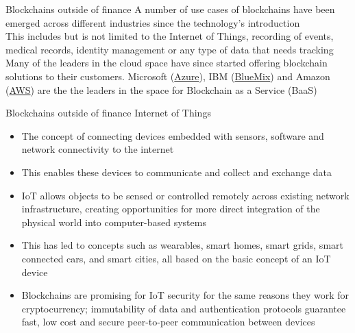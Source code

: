 \documentclass[10pt]{beamer}
\begin{document}
\begin{frame}{Blockchains outside of finance}
	A number of use cases of blockchains have been emerged across different industries since the technology's introduction \\ \vspace{3mm}
	This includes but is not limited to the Internet of Things, recording of events, medical records, identity management or any type of data that needs tracking \\ \vspace{3mm}
	Many of the leaders in the cloud space have since started offering blockchain solutions to their customers.
	Microsoft (\href{https://azure.microsoft.com/en-us/solutions/blockchain/}{Azure}), IBM (\href{https://console.bluemix.net/catalog/services/blockchain/}{BlueMix}) and Amazon (\href{https://aws.amazon.com/marketplace/}{AWS}) are the the leaders in the space for Blockchain as a Service (BaaS)
\end{frame}



\begin{frame}{Blockchains outside of finance}
	Internet of Things
	\begin{itemize}
		\item The concept of connecting devices embedded with sensors, software and network connectivity to the internet
		\item This enables these devices to communicate and collect and exchange data
		\item IoT allows objects to be sensed or controlled remotely across existing network infrastructure, creating opportunities for more direct integration of the physical world into computer-based systems
		\item This has led to concepts such as wearables, smart homes, smart grids, smart connected cars, and smart cities, all based on the basic concept of an IoT device
		\item Blockchains are promising for IoT security for the same reasons they work for cryptocurrency; immutability of data and authentication protocols guarantee fast, low cost and secure peer-to-peer communication between devices
	\end{itemize}
\end{frame}

\end{document}
